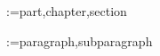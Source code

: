 \makeatletter
\newcommand{\crefnames}[3]{%
  \@for\next:=#1\do{%
    \expandafter\crefname\expandafter{\next}{#2}{#3}%
  }%
}
\makeatother

\setcounter{secnumdepth}{100}

\crefnames{part,chapter,section}{\S}{\S\S}
\crefnames{paragraph,subparagraph}{\P}{\P\P}







\newcommand{\myPart}[1]{%
  \part{#1}%
  \addtocontents{toc}{\vskip-6pt\par\noindent\protect\hrulefill\par}
}
